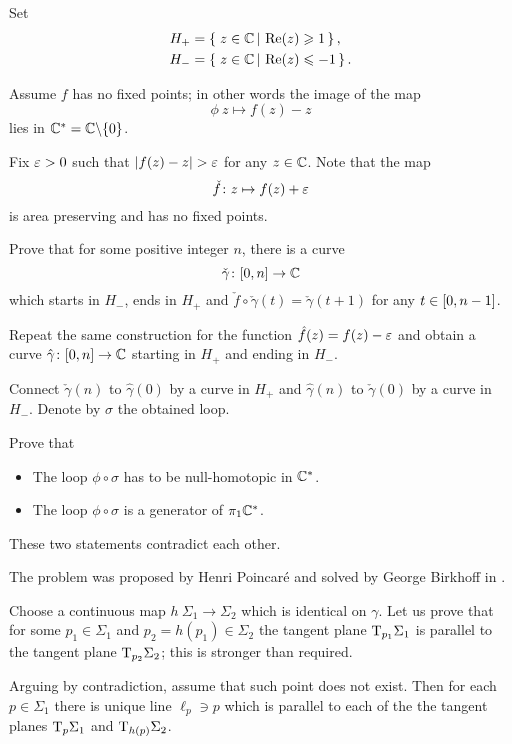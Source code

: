 Set 
\begin{align*}
H_+&=\set{z\in\CC}{\Re(z)\ge 1},
\\
H_-&=\set{z\in\CC}{\Re(z)\le -1}.
\end{align*}

Assume $f$ has no fixed points;
in other words the image of the map 
\[\phi\:z\mapsto f(z)-z\] 
lies in $\mathbb{C}^*=\mathbb{C}\backslash\{0\}$.


Fix $\varepsilon>0$ such that $|f(z)-z|>\eps$ for any $z\in\mathbb{C}$.
Note that the map 
\[\check f\colon z\mapsto f(z)+\varepsilon\]
is area preserving and has no fixed points.

Prove that for some positive integer $n$,
there is a curve 
\[\check \gamma\colon[0,n]\to \mathbb{C}\]
which starts in $H_-$, ends in $H_+$
and 
$\check f\circ\check\gamma(t)=\check\gamma(t+1)$
for any $t\z\in [0,n-1]$.

Repeat the same construction for the function $\hat f(z)=f(z)-\varepsilon$ and obtain a curve $\hat \gamma\colon[0,n]\to \mathbb{C}$ starting in $H_+$ and ending in $H_-$.

Connect $\check\gamma(n)$ to $\hat \gamma(0)$ by a curve in $H_+$ 
and 
$\hat\gamma(n)$ to  $\check\gamma(0)$ by a curve in $H_-$.
Denote by $\sigma$ the obtained loop.

Prove that
\begin{itemize}
\item The loop $\phi\circ\sigma$ has to be null-homotopic in $\mathbb{C}^*$.
\item The loop $\phi\circ\sigma$ is a generator of $\pi_1\mathbb{C}^*$.
\end{itemize}
These two statements contradict each other. \qeds


The problem was proposed by Henri Poincar\'e \cite[see][]{poincare}
and solved by George Birkhoff in \cite{birkhoff}.



 






Choose a continuous map $h\:\Sigma_1\to \Sigma_2$
which is identical on $\gamma$.
Let us prove that for some $p_1\in \Sigma_1$ and $p_2=h(p_1)\in \Sigma_2$
the tangent plane $\mathrm{T}_{p_1} \Sigma_1$ is parallel to the tangent plane $\mathrm{T}_{p_2} \Sigma_2$;
this is stronger than required.

Arguing by contradiction,
assume that such point does not exist.
Then for each $p\in\Sigma_1$
there is unique line $\ell_p\ni p$ 
which is parallel to each of the the tangent planes $\mathrm{T}_{p} \Sigma_1$ and $\mathrm{T}_{h(p)} \Sigma_2$.

